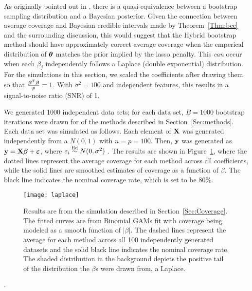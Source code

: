 As originally pointed out in \cite{Rubin1981}, there is a quasi-equivalence between a bootstrap sampling distribution and a Bayesian posterior. Given the connection between average coverage and Bayesian credible intervals made by Theorem~\ref{Thm:bcc} and the surrounding discussion, this would suggest that the Hybrid bootstrap method should have approximately correct average coverage when the emperical distribution of $\boldsymbol{\theta}$ matches the prior implied by the lasso penalty. This \emph{can}  occur when each $\beta_j$ independently follows a Laplace (double exponential) distribution. For the simulations in this section, we scaled the coefficients after drawing them so that $\frac{\boldsymbol{\beta}^T\boldsymbol{\beta}}{p} = 1$. With $\sigma^2=100$ and independent features, this results in a signal-to-noise ratio (SNR) of 1. 

We generated 1000 independent data sets; for each data set, $B = 1000$ bootstrap iterations were drawn for  of the methods described in Section~\ref{Sec:methods}. Each data set was simulated as follows. Each element of $\mathbf{X}$ was generated independently from a $N(0, 1)$ with $n = p = 100$. Then, $\mathbf{y}$ was generated as $\mathbf{y} = \mathbf{X}\boldsymbol{\beta} + \boldsymbol{\varepsilon}$, where $\varepsilon_i \overset{\text{iid}}{\sim} N(0, \sigma^2)$ . The results are shown in Figure~\ref{Fig:laplace}, where the dotted lines represent the average coverage for each method across all coefficients, while the solid lines are smoothed estimates of coverage as a function of $\beta$. The black line indicates the nominal coverage rate, which is set to be 80\%.

\begin{figure}[hbtp]
  \begin{center}
  \texttt{[image: laplace]}
  \caption{\label{Fig:laplace} Results are from the simulation described in Section~\ref{Sec:Coverage}. The fitted curves are from Binomial GAMs fit with coverage being modeled as a smooth function of $|\beta|$. The dashed lines represent the average for each method across all 100 independently generated datasets and the solid black line indicates the nominal coverage rate. The shaded distribution in the background depicts the positive tail of the distribution the $\beta$s were drawn from, a Laplace.}
  \end{center}
\end{figure}

.


